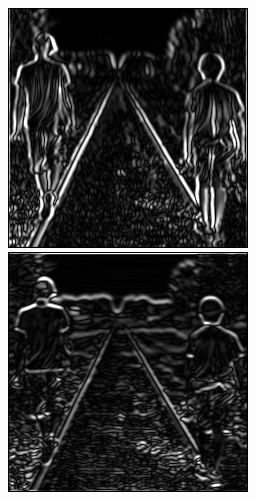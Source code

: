 \documentclass[epsfig,10pt,fullpage]{article}
\begin{document}
~\\
\begin{figure}[h]
\centering
\begin{minipage}[b]{0.32\textwidth}
	\includegraphics[width=\textwidth]{figures/stage2_gradient_x.png}
\end{minipage}
\hfill
\begin{minipage}[b]{0.32\textwidth}
	\includegraphics[width=\textwidth]{figures/stage2_gradient_y.png}

\end{minipage}
\end{figure}
\end{document}
